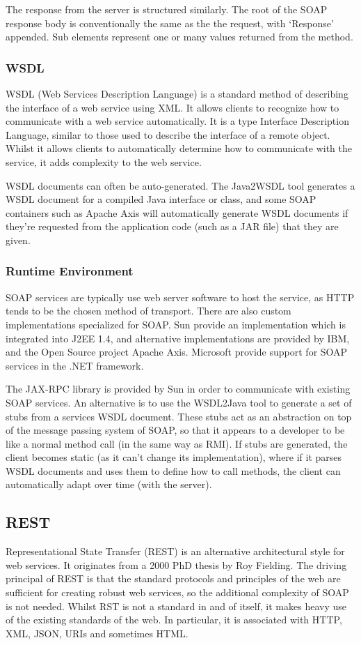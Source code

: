 \documentclass{article}
\begin{document}
The response from the server is structured similarly. The root of the SOAP response body is conventionally the same as the the request, with `Response' appended. Sub elements represent one or many values returned from the method.

\subsubsection{WSDL}
WSDL (Web Services Description Language) is a standard method of describing the interface of a web service using XML. It allows clients to recognize how to communicate with a web service automatically. It is a type Interface Description Language, similar to those used to describe the interface of a remote object. Whilst it allows clients to automatically determine how to communicate with the service, it adds complexity to the web service.

WSDL documents can often be auto-generated. The Java2WSDL tool generates a WSDL document for a compiled Java interface or class, and some SOAP containers such as Apache Axis will automatically generate WSDL documents if they're requested from the application code (such as a JAR file) that they are given. 

\subsubsection{Runtime Environment}
SOAP services are typically use web server software to host the service, as HTTP tends to be the chosen method of transport. There are also custom implementations specialized for SOAP. Sun provide an implementation which is integrated into J2EE 1.4, and alternative implementations are provided by IBM, and the Open Source project Apache Axis. Microsoft provide support for SOAP services in the .NET framework. 

The JAX-RPC library is provided by Sun in order to communicate with existing SOAP services. An alternative is to use the WSDL2Java tool to generate a set of stubs from a services WSDL document. These stubs act as an abstraction on top of the message passing system of SOAP, so that it appears to a developer to be like a normal method call (in the same way as RMI). If stubs are generated, the client becomes static (as it can't change its implementation), where if it parses WSDL documents and uses them to define how to call methods, the client can automatically adapt over time (with the server). 

\subsection{REST}
Representational State Transfer (REST) is an alternative architectural style for web services. It originates from a 2000 PhD thesis by Roy Fielding. The driving principal of REST is that the standard protocols and principles of the web are sufficient for creating robust web services, so the additional complexity of SOAP is not needed. Whilst RST is not a standard in and of itself, it makes heavy use of the existing standards of the web. In particular, it is associated with HTTP, XML, JSON, URIs and sometimes HTML. 
\end{document}
